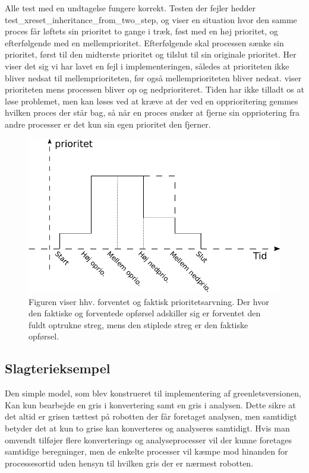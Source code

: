  Alle test med en undtagelse fungere korrekt. Testen der fejler  hedder test\_xreset\_inheritance\_from\_two\_step, og viser en situation hvor den samme proces får løftets sin prioritet to gange i træk, føst med en høj prioritet, og efterfølgende med en mellemprioritet. Efterfølgende skal processen sænke sin prioritet, først til den midterste prioritet og tilslut til sin originale prioritet. Her viser det sig vi har lavet en fejl i implementeringen, således at prioriteten ikke bliver nedsat til mellemprioriteten, før også mellemprioriteten bliver nedsat.  viser prioriteten mens processen bliver op og nedprioriteret. Tiden har ikke tilladt os at løse problemet, men  kan løses ved at kræve at der ved en opprioritering gemmes hvilken proces der står bag, så når en proces ønsker at fjerne sin oppriotering fra andre processer er det kun sin egen  prioritet den fjerner.  
 
  
\begin{figure}
 \begin{center}
  \includegraphics[scale=1]{images/priority-inheritance}
	\caption{Figuren viser hhv. forventet og faktisk prioritetsarvning. Der hvor den faktiske og forventede opførsel adskiller sig er forventet den fuldt optrukne streg, mens den stiplede streg er den faktiske opførsel.}
	\label{fig:priority-inheritance}
\end{center}
\end{figure}
  

\subsection{Slagterieksempel}
Den simple model, som blev konstrueret til implementering af greenletsversionen, Kan kun bearbejde en gris i konvertering samt en gris i analysen. Dette sikre at det altid er grisen tættest på robotten der får foretaget analysen, men samtidigt betyder det at kun to grise kan konverteres og analyseres samtidigt. Hvis man omvendt tilføjer flere konverterings og analyseprocesser vil der kunne foretages samtidige beregninger, men de enkelte processer vil kæmpe mod hinanden for processesortid uden hensyn til hvilken gris der er nærmest robotten.

